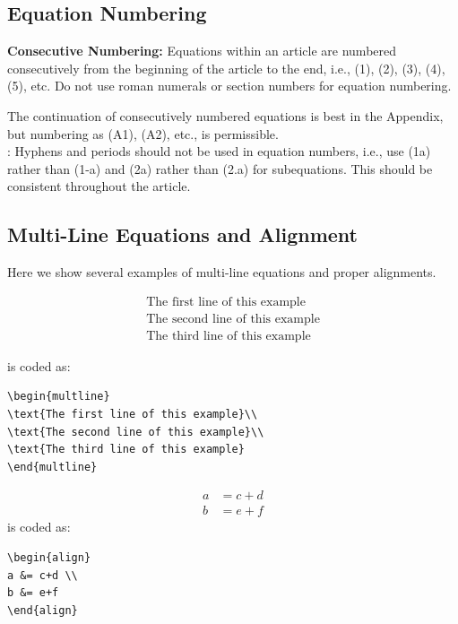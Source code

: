 \documentclass[journal]{IEEEtran}
\begin{document}
\subsection{Equation Numbering}
{\bf{Consecutive Numbering:}} Equations within an article are numbered consecutively from the beginning of the
article to the end, i.e., (1), (2), (3), (4), (5), etc. Do not use roman numerals or section numbers for equation numbering.

 The continuation of consecutively numbered equations is best in the Appendix, but numbering
 as (A1), (A2), etc., is permissible.\\

: Hyphens and periods should not be used in equation numbers, i.e., use (1a) rather than
(1-a) and (2a) rather than (2.a) for subequations. This should be consistent throughout the article.

\subsection{Multi-Line Equations and Alignment}
Here we show several examples of multi-line equations and proper alignments.

\begin{multline}
\text{The first line of this example}\\
\text{The second line of this example}\\
\text{The third line of this example}
\end{multline}

\noindent is coded as:
\begin{verbatim}
\begin{multline}
\text{The first line of this example}\\
\text{The second line of this example}\\
\text{The third line of this example}
\end{multline}
\end{verbatim}

\begin{align}
a &= c+d \\
b &= e+f
\end{align}
\noindent is coded as:
\begin{verbatim}
\begin{align}
a &= c+d \\
b &= e+f
\end{align}
\end{verbatim}
\end{document}
